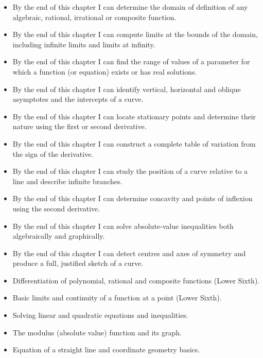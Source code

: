 \documentclass[11pt]{article}
\begin{document}
\begin{objectifs}
\begin{itemize}
\item By the end of this chapter I can determine the domain of definition of any algebraic, rational, irrational or composite function.
\item By the end of this chapter I can compute limits at the bounds of the domain, including infinite limits and limits at infinity.
\item By the end of this chapter I can find the range of values of a parameter for which a function (or equation) exists or has real solutions.
\item By the end of this chapter I can identify vertical, horizontal and oblique asymptotes and the intercepts of a curve.
\item By the end of this chapter I can locate stationary points and determine their nature using the first or second derivative.
\item By the end of this chapter I can construct a complete table of variation from the sign of the derivative.
\item By the end of this chapter I can study the position of a curve relative to a line and describe infinite branches.
\item By the end of this chapter I can determine concavity and points of inflexion using the second derivative.
\item By the end of this chapter I can solve absolute-value inequalities both algebraically and graphically.
\item By the end of this chapter I can detect centres and axes of symmetry and produce a full, justified sketch of a curve.
\end{itemize}
\end{objectifs}

\begin{prerequis}
\begin{itemize}
\item Differentiation of polynomial, rational and composite functions (Lower Sixth).
\item Basic limits and continuity of a function at a point (Lower Sixth).
\item Solving linear and quadratic equations and inequalities.
\item The modulus (absolute value) function and its graph.
\item Equation of a straight line and coordinate geometry basics.
\end{itemize}
\end{prerequis}
\end{document}
